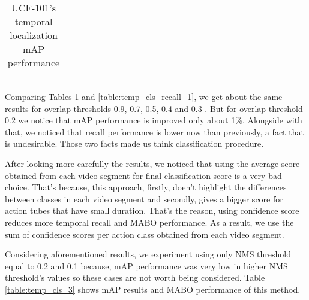 \begin{center}
\begin{longtable}{|| c | c || c c c | c ||}
    \hline

    \caption{UCF-101's temporal localization mAP performance}
    \label{table:temp_cls_2}
  \end{longtable}
\end{center}

Comparing Tables \ref{table:temp_cls_2} and \ref{table:temp_cls_recall_1}, we get about the same results for overlap thresholds 0.9, 0.7, 0.5, 0.4 and
0.3 . But for overlap threshold 0.2 we notice that mAP performance is improved  only about 1\%. Alongside with that, we noticed that recall performance is lower now than previously, a fact
that is undesirable. Those two facts made us think classification procedure. \par


After looking more carefully the results, we noticed that using  the average score obtained from each video segment for final classification score is a very bad choice. That's because,
this approach, firstly, doen't highlight the differences between classes in each video segment and secondly, gives a bigger score for action tubes that have small duration. That's the
reason, using confidence score reduces more temporal recall and MABO performance. As a result, we use the sum of confidence scores per action class obtained from each video segment. \par

Considering aforementioned results, we experiment using only NMS threshold equal to 0.2 and 0.1 because, mAP performance was very low in higher NMS threshold's values so these cases
are not worth being considered. Table \ref{table:temp_cls_3} shows mAP results and MABO performance of this method.

